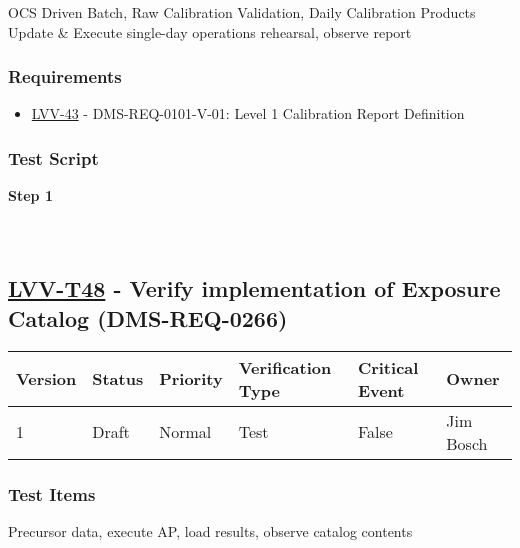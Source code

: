 OCS Driven Batch, Raw Calibration Validation, Daily Calibration Products
Update \& Execute single-day operations rehearsal, observe report

\hypertarget{requirements-137}{%
\subsubsection{Requirements}\label{requirements-137}}

\begin{itemize}
\tightlist
\item
  \href{https://jira.lsstcorp.org/browse/LVV-43}{LVV-43} -
  DMS-REQ-0101-V-01: Level 1 Calibration Report Definition
\end{itemize}

\hypertarget{test-script-137}{%
\subsubsection{Test Script}\label{test-script-137}}

\textbf{Step 1}\\
~\\
~\\

\hypertarget{lvv-t48---verify-implementation-of-exposure-catalog-dms-req-0266}{%
\subsection{\texorpdfstring{\href{https://jira.lsstcorp.org/secure/Tests.jspa\#/testCase/LVV-T48}{LVV-T48}
- Verify implementation of Exposure Catalog
(DMS-REQ-0266)}{LVV-T48 - Verify implementation of Exposure Catalog (DMS-REQ-0266)}}\label{lvv-t48---verify-implementation-of-exposure-catalog-dms-req-0266}}

\begin{longtable}[]{@{}llllll@{}}
\toprule
Version & Status & Priority & Verification Type & Critical Event &
Owner\tabularnewline
\midrule
\endhead
1 & Draft & Normal & Test & False & Jim Bosch\tabularnewline
\bottomrule
\end{longtable}

\hypertarget{test-items-137}{%
\subsubsection{Test Items}\label{test-items-137}}

Precursor data, execute AP, load results, observe catalog contents

